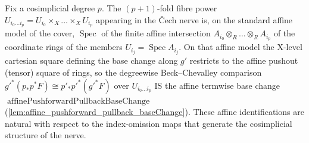 
\begin{lemma}\leanok
  \label{lem:cech_degree_affine_baseChange}
  Fix a cosimplicial degree \(p\). The \((p+1)\)-fold fibre power
  \(U_{i_0\dots i_p} = U_{i_0} \times_X \dots \times_X U_{i_p}\) appearing in the
  {\v C}ech nerve is, on the standard affine model of the cover, \(\operatorname{Spec}\)
  of the finite affine intersection \(A_{i_0} \otimes_R \dots \otimes_R A_{i_p}\) of the
  coordinate rings of the members \(U_{i_j} = \operatorname{Spec} A_{i_j}\). On that
  affine model the X-level cartesian square defining the base change along \(g'\)
  restricts to the affine pushout (tensor) square of rings, so the degreewise
  Beck--Chevalley comparison
  \(g'^*(p_* p^* F) \cong p'_* p'^*(g'^* F)\) over \(U_{i_0\dots i_p}\) IS the affine
  termwise base change \(\operatorname{affinePushforwardPullbackBaseChange}\)
  (\cref{lem:affine_pushforward_pullback_baseChange}). These affine identifications are
  natural with respect to the index-omission maps that generate the cosimplicial
  structure of the nerve.
\end{lemma}

